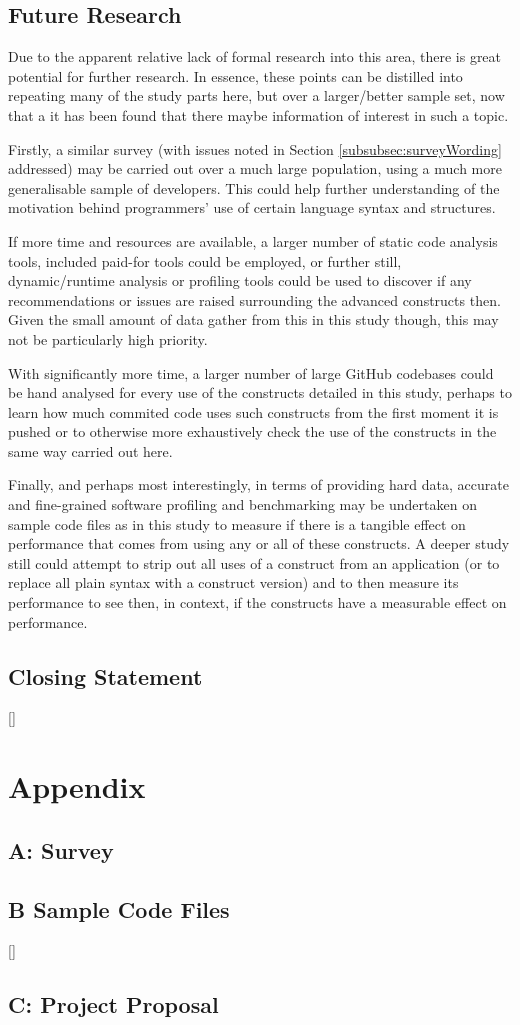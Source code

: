\documentclass{article}
\begin{document}
    \subsection{Future Research}
        Due to the apparent relative lack of formal research into this area, there is great potential for further research. In essence, these points can be distilled into repeating many of the study parts here, but over a larger/better sample set, now that a it has been found that there maybe information of interest in such a topic.
        
        Firstly, a similar survey (with issues noted in Section \ref{subsubsec:surveyWording} addressed) may be carried out over a much large population, using a much more generalisable sample of developers. This could help further understanding of the motivation behind programmers' use of certain language syntax and structures.
            
        If more time and resources are available, a larger number of static code analysis tools, included paid-for tools could be employed, or further still, dynamic/runtime analysis or profiling tools could be used to discover if any recommendations or issues are raised surrounding the advanced constructs then. Given the small amount of data gather from this in this study though, this may not be particularly high priority.
        
        With significantly more time, a larger number of large GitHub codebases could be hand analysed for every use of the constructs detailed in this study, perhaps to learn how much commited code uses such constructs from the first moment it is pushed or to otherwise more exhaustively check the use of the constructs in the same way carried out here.
            
        Finally, and perhaps most interestingly, in terms of providing hard data, accurate and fine-grained software profiling and benchmarking may be undertaken on sample code files as in this study to measure if there is a tangible effect on performance that comes from using any or all of these constructs. A deeper study still could attempt to strip out all uses of a construct from an application (or to replace all plain syntax with a construct version) and to then measure its performance to see then, in context, if the constructs have a measurable effect on performance.
    \subsection{Closing Statement}
        []

\newpage

\newpage
\section*{Appendix}
    \subsection*{A: Survey}
        
    \subsection*{B Sample Code Files}
    []
    \subsection*{C: Project Proposal}
        
\end{document}
